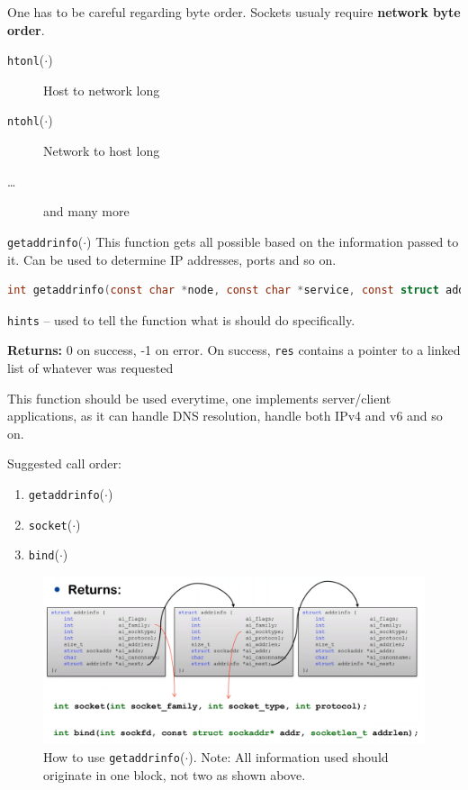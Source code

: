 \documentclass[english]{panikzettel}
\newcommand{\fkt}[1]{\texttt{#1}(\(\cdot\))}
\begin{document}
	One has to be careful regarding byte order. 
	Sockets usualy require \textbf{network byte order}. 
	
	\begin{description}
		\item[\fkt{htonl}] Host to network long
		\item[\fkt{ntohl}] Network to host long
		\item[\dots] and many more
	\end{description}

	\begin{defi}{\fkt{getaddrinfo}}
		This function gets all possible based on the information passed to it.
		Can be used to determine IP addresses, ports and so on.
		\begin{lstlisting}[language=C]
			int getaddrinfo(const char *node, const char *service, const struct addrinfo *hints, struct addrinfo **res);	
		\end{lstlisting}
		\tcblower
		\texttt{hints} – used to tell the function what is should do specifically.

		\textbf{Returns:} 0 on success, -1 on error. 
		On success, \texttt{res} contains a pointer to a linked list of whatever was requested
	\end{defi}
	This function should be used everytime, one implements server/client applications, as it can handle DNS resolution, handle both IPv4 and v6 and so on.

	Suggested call order:
	\begin{enumerate}
		\item \fkt{getaddrinfo}
		\item \fkt{socket}
		\item \fkt{bind}
	\end{enumerate}

	\begin{figure}[H]
		\centering
		\includegraphics[width=\textwidth]{img/1-getaddrinfo-usage.png}
		\caption{How to use \fkt{getaddrinfo}. Note: All information used should originate in one block, not two as shown above.}
		\label{img-1-getaddrinfo-usage}
	\end{figure}	
	
\end{document}

